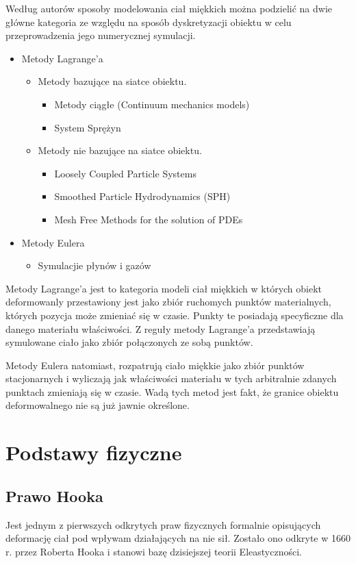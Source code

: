 Według autorów sposoby modelowania ciał miękkich można
podzielić na dwie główne kategoria ze względu na sposób dyskretyzacji
obiektu w celu przeprowadzenia jego numerycznej symulacji.
\begin{itemize}
\item Metody Lagrange'a
	\begin{itemize}
	\item Metody bazujące na siatce obiektu.
		\begin{itemize}
			\item Metody ciągłe (Continuum mechanics models)
			\item System Sprężyn
		\end{itemize}
	\item Metody nie bazujące na siatce obiektu.
		\begin{itemize}
			\item Loosely Coupled Particle Systems 
			\item Smoothed Particle Hydrodynamics (SPH) 
			\item Mesh Free Methods for the solution of PDEs 
		\end{itemize}
	\end{itemize}
\item Metody Eulera
	\begin{itemize}
		\item Symulacjie płynów i gazów
	\end{itemize}
\end{itemize}

Metody Lagrange'a jest to kategoria modeli ciał miękkich w których obiekt
deformowanly przestawiony jest jako zbiór ruchomych punktów materialnych,
 których pozycja może zmieniać się w czasie. Punkty te posiadają
 specyficzne dla danego materiału właściwości. Z reguły metody
 Lagrange'a przedstawiają symulowane ciało jako zbiór połączonych ze
 sobą punktów.
 
Metody Eulera natomiast, rozpatrują ciało miękkie jako zbiór punktów
stacjonarnych i wyliczają jak właściwości materiału w tych arbitralnie zdanych
punktach zmieniają się w czasie. Wadą tych metod jest fakt, że granice obiektu
deformowalnego nie są już jawnie określone.\cite{pbdo}

\section{Podstawy fizyczne}
\subsection{Prawo Hooka}
Jest jednym z pierwszych odkrytych praw fizycznych formalnie opisujących deformację ciał pod wpływam
działających na nie sił. Zostało ono odkryte w 1660 r. przez Roberta Hooka i 
stanowi bazę dzisiejszej teorii Eleastyczności\cite{elast}.

